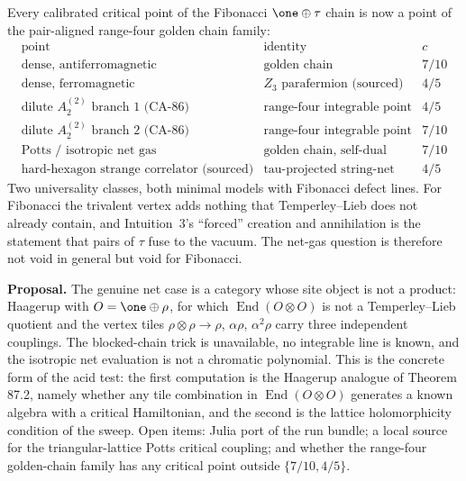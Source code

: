 Every calibrated critical point of the Fibonacci \(\one\oplus\tau\) chain is
now a point of the pair-aligned range-four golden chain family:
\[
\begin{array}{l|l|c}
\text{point} & \text{identity} & c\\\hline
\text{dense, antiferromagnetic} & \text{golden chain} & 7/10\\
\text{dense, ferromagnetic} & Z_3\text{ parafermion (sourced)} & 4/5\\
\text{dilute } A_2^{(2)}\text{ branch 1 (CA-86)} & \text{range-four integrable point} & 4/5\\
\text{dilute } A_2^{(2)}\text{ branch 2 (CA-86)} & \text{range-four integrable point} & 7/10\\
\text{Potts / isotropic net gas} & \text{golden chain, self-dual} & 7/10\\
\text{hard-hexagon strange correlator (sourced)} & \text{tau-projected string-net} & 4/5
\end{array}
\]
Two universality classes, both minimal models with Fibonacci defect lines.
For Fibonacci the trivalent vertex adds nothing that Temperley--Lieb does not
already contain, and Intuition~3's ``forced'' creation and annihilation is
the statement that pairs of \(\tau\) fuse to the vacuum.  The net-gas
question is therefore not void in general but void for Fibonacci.

\textbf{Proposal.}  The genuine net case is a category whose site object is
not a product: Haagerup with \(O=\one\oplus\rho\), for which
\(\operatorname{End}(O\otimes O)\) is not a Temperley--Lieb quotient and the
vertex tiles \(\rho\otimes\rho\to\rho\), \(\alpha\rho\), \(\alpha^2\rho\) carry
three independent couplings.  The blocked-chain trick is unavailable, no
integrable line is known, and the isotropic net evaluation is not a
chromatic polynomial.  This is the concrete form of the acid test: the first
computation is the Haagerup analogue of Theorem 87.2, namely whether any
tile combination in \(\operatorname{End}(O\otimes O)\) generates a known
algebra with a critical Hamiltonian, and the second is the lattice
holomorphicity condition of the sweep.  Open items: Julia port of the run
bundle; a local source for the triangular-lattice Potts critical coupling;
and whether the range-four golden-chain family has any critical point
outside \(\{7/10,4/5\}\).
